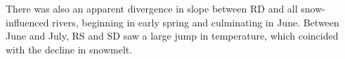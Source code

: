 \documentclass[notitlepage]{article}
\begin{document}
There was also an apparent divergence in slope between RD and all snow-influenced rivers, beginning in early spring and culminating in June. Between June and July, RS and SD saw a large jump in temperature, which coincided with the decline in snowmelt.

\end{document}
